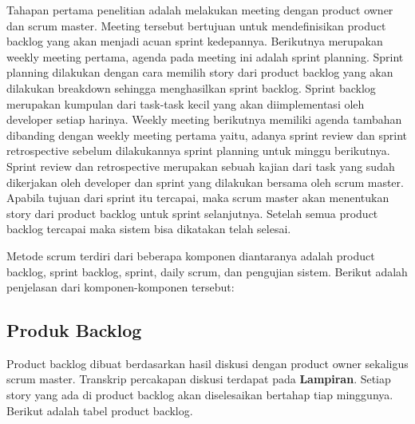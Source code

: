 Tahapan pertama penelitian adalah melakukan meeting dengan product owner dan scrum master. Meeting tersebut bertujuan untuk mendefinisikan product backlog yang akan menjadi acuan sprint kedepannya. Berikutnya merupakan weekly meeting pertama, agenda pada meeting ini adalah sprint planning. Sprint planning dilakukan dengan cara memilih story dari product backlog yang akan dilakukan breakdown sehingga menghasilkan sprint backlog. Sprint backlog merupakan kumpulan dari task-task kecil yang akan diimplementasi oleh developer setiap harinya. Weekly meeting berikutnya memiliki agenda tambahan dibanding dengan weekly meeting pertama yaitu, adanya sprint review dan sprint retrospective sebelum dilakukannya sprint planning untuk minggu berikutnya. Sprint review dan retrospective merupakan sebuah kajian dari task yang sudah dikerjakan oleh developer dan sprint yang dilakukan bersama oleh scrum master. Apabila tujuan dari sprint itu tercapai, maka scrum master akan menentukan story dari product backlog untuk sprint selanjutnya. Setelah semua product backlog tercapai maka sistem bisa dikatakan telah selesai.

Metode scrum terdiri dari beberapa komponen diantaranya adalah product backlog, sprint backlog, sprint, daily scrum, dan pengujian sistem. Berikut adalah penjelasan dari komponen-komponen tersebut:

	\subsection{Produk Backlog}
	
	Product backlog dibuat berdasarkan hasil diskusi dengan product owner sekaligus scrum master. Transkrip percakapan diskusi terdapat pada \textbf{Lampiran}. Setiap story yang ada di product backlog akan diselesaikan bertahap tiap minggunya. Berikut adalah tabel product backlog.
	
